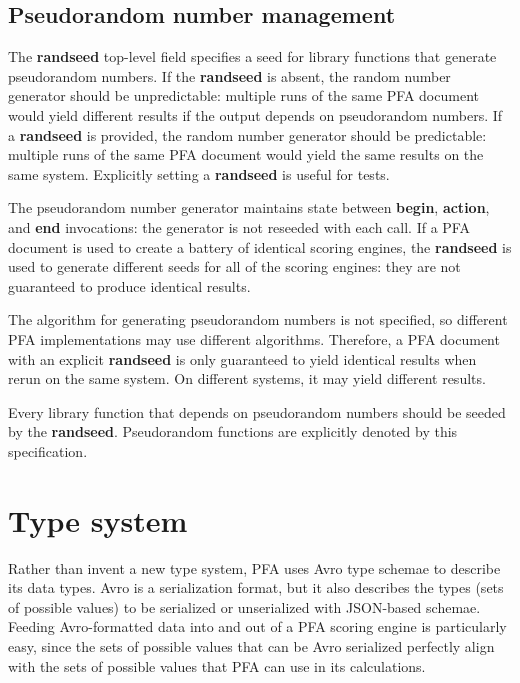 \documentclass{article}
\newcommand{\PFAc}{\ttfamily\bfseries}
\theoremstyle{definition}
\begin{document}
\hypertarget{hsec:random}{}
\subsection{Pseudorandom number management}
\label{sec:random}

The {\PFAc randseed} top-level field specifies a seed for library functions that generate pseudorandom numbers.  If the {\PFAc randseed} is absent, the random number generator should be unpredictable: multiple runs of the same PFA document would yield different results if the output depends on pseudorandom numbers.  If a {\PFAc randseed} is provided, the random number generator should be predictable: multiple runs of the same PFA document would yield the same results on the same system.  Explicitly setting a {\PFAc randseed} is useful for tests.

The pseudorandom number generator maintains state between {\PFAc begin}, {\PFAc action}, and {\PFAc end} invocations: the generator is not reseeded with each call.  If a PFA document is used to create a battery of identical scoring engines, the {\PFAc randseed} is used to generate different seeds for all of the scoring engines: they are not guaranteed to produce identical results.

The algorithm for generating pseudorandom numbers is not specified, so different PFA implementations may use different algorithms.  Therefore, a PFA document with an explicit {\PFAc randseed} is only guaranteed to yield identical results when rerun on the same system.  On different systems, it may yield different results.

Every library function that depends on pseudorandom numbers should be seeded by the {\PFAc randseed}.  Pseudorandom functions are explicitly denoted by this specification.

\pagebreak

\section{Type system}

Rather than invent a new type system, PFA uses Avro type schemae to describe its data types.  Avro is a serialization format, but it also describes the types (sets of possible values) to be serialized or unserialized with JSON-based schemae.  Feeding Avro-formatted data into and out of a PFA scoring engine is particularly easy, since the sets of possible values that can be Avro serialized perfectly align with the sets of possible values that PFA can use in its calculations.
\end{document}
